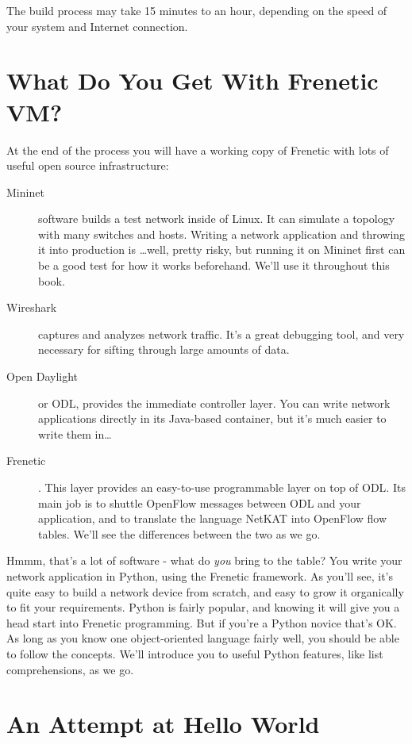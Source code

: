 The build process may take 15 minutes to an hour, depending on the speed of your system and Internet connection. 

\section{What Do You Get With Frenetic VM?}

At the end of the process you will have a working copy of Frenetic with lots of useful open source infrastructure:

\begin{description}
\item[Mininet] software builds a test network inside of Linux.  
It can simulate a topology with many switches and hosts.  
Writing a network application and throwing it into production is \ldots well, pretty risky, but running it on Mininet first can be a good test for how it works beforehand.  
We'll use it throughout this book.  
\item[Wireshark] captures and analyzes network traffic.  
It's a great debugging tool, and very necessary for sifting through large amounts of data.
\item[Open Daylight] or ODL, provides the immediate controller layer.  You can write network applications directly in its Java-based container, but it's much easier to write them in\ldots
\item[Frenetic].  This layer provides an easy-to-use programmable layer on top of ODL.  Its main job is to shuttle OpenFlow messages between ODL and your application, and to translate the language NetKAT into OpenFlow flow tables.  We'll see the differences between the two as we go.
\end{description}

Hmmm, that's a lot of software - what do {\it you} bring to the table?  You write your network application in Python, using the Frenetic framework.  As you'll see, it's quite easy to build a network device from scratch, and easy to grow it organically to fit your requirements.  Python is fairly popular, and knowing it will give you  a head start into Frenetic programming.  But if you're a Python novice that's OK.  As long as you know one object-oriented language fairly well, you should be able to follow the concepts.  We'll introduce you to useful Python features, like list comprehensions, as we go.  

\section{An Attempt at Hello World}

